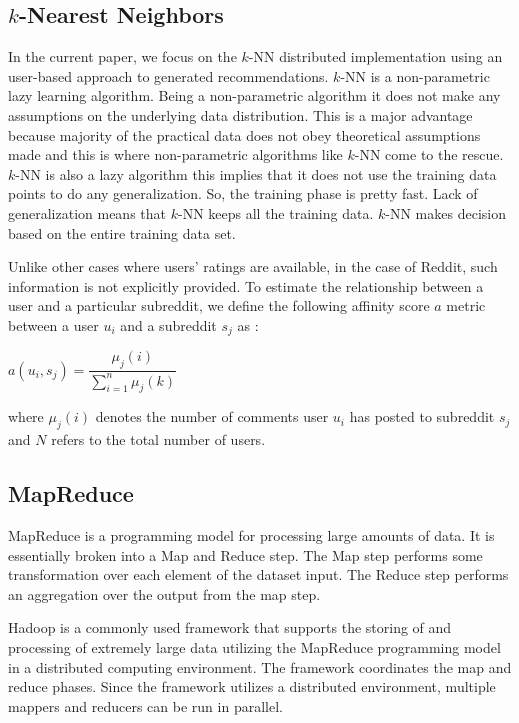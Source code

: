 \documentclass[conference, 12pt]{IEEEtran}
\begin{document}
\subsection{$k$-Nearest Neighbors}
In the current paper, we focus on the $k$-NN distributed implementation using an user-based approach to generated recommendations.
$k$-NN is a non-parametric lazy learning algorithm. Being a non-parametric algorithm it does not make any assumptions on the underlying data distribution. This is a major advantage because majority of the practical data does not obey theoretical assumptions made and this is where non-parametric algorithms like $k$-NN come to the rescue. $k$-NN is also a lazy algorithm this implies that it does not use the training data points to do any generalization. So, the training phase is pretty fast. Lack of generalization means that $k$-NN keeps all the training data. $k$-NN makes decision based on the entire training data set. 

Unlike other cases where users' ratings are available, in the case of Reddit, such information is not explicitly provided. To estimate the relationship between a user and a particular subreddit, we define the following affinity score $a$  metric between a user $u_i$ and a subreddit $s_j$ as :  
\begin{center}
$a(u_i,s_j) =   \dfrac{\mu_j(i)}{ {\sum\limits_{i=1}^{n}\mu_j(k)}} $ \end{center}

where $\mu_j(i)$ denotes the number of comments user $u_i$ has posted to subreddit $s_j$ and $N$ refers to the total number of users.
 
 
\subsection{MapReduce}

MapReduce is a programming model for processing large amounts of data.  It is essentially broken into a Map and Reduce step.  The Map step performs some transformation over each element of the dataset input.  The Reduce step performs an aggregation over the output from the map step.

Hadoop is a commonly used framework that supports the storing of and processing of extremely large data utilizing the MapReduce programming model in a distributed computing environment.  The framework coordinates the map and reduce phases.  Since the framework utilizes a distributed environment, multiple mappers and reducers can be run in parallel.
\end{document}
